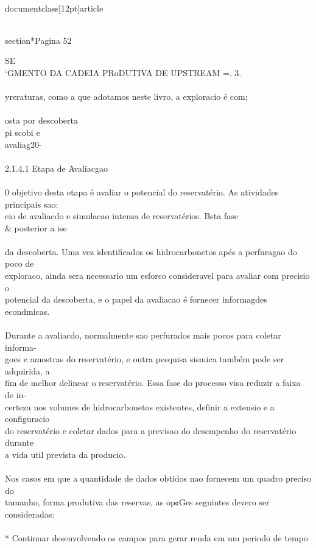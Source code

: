 \\documentclass[12pt]{article}
\begin{document}
\\section*{Pagina 52}

SE\\
‘GMENTO DA CADEIA PRoDUTIVA DE UPSTREAM =. 3.\\
\\
yreraturas, como a que adotamos neste livro, a exploracio é com;\\
\\
osta por descoberta\\
pi scobi e\\
avaliag20-\\
\\
2.1.4.1 Etapa de Avaliacgao\\
\\
0 objetivo desta etapa é avaliar o potencial do reservatério. As atividades principais sao:\\
cio de avaliacdo e simulacao intensa de reservatérios. Bsta fase \\& posterior a ise\\
\\
da descoberta. Uma vez identificados os hidrocarbonetos apés a perfuragao do poco de\\
exploraco, ainda sera necessario um esforco consideravel para avaliar com precisio o\\
potencial da descoberta, e o papel da avaliacao é fornecer informagdes econdmicas.\\
\\
Durante a avaliacdo, normalmente sao perfurados mais pocos para coletar informa-\\
goes e amostras do reservatério, e outra pesquisa sismica também pode ser adquirida, a\\
fim de melhor delinear o reservatério. Essa fase do processo visa reduzir a faixa de in-\\
certeza nos volumes de hidrocarbonetos existentes, definir a extensio e a configuracio\\
do reservatério e coletar dados para a previsao do desempenho do reservatério durante\\
a vida util prevista da producio.\\
\\
Nos casos em que a quantidade de dados obtidos nao fornecem um quadro preciso do\\
tamanho, forma produtiva das reservas, as op¢Ges seguintes devero ser consideradas:\\
\\
* Continuar desenvolvendo os campos para gerar renda em um periodo de tempo\\
\end{document}
